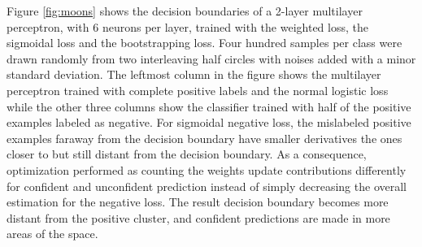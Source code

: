 Figure \ref{fig:moons} shows the decision boundaries of a 2-layer multilayer perceptron, with 6 neurons per layer, trained with the weighted loss, the sigmoidal loss and the bootstrapping loss.
Four hundred samples per class were drawn randomly from two interleaving half circles with noises added with a minor standard deviation.
The leftmost column in the figure shows the multilayer perceptron trained with complete positive labels and the normal logistic loss while the other three columns show the classifier trained with half of the positive examples labeled as negative.
For sigmoidal negative loss, the mislabeled positive examples faraway from the decision boundary have smaller derivatives the ones closer to but still distant from the decision boundary.
As a consequence, optimization performed as counting the weights update contributions differently for confident and unconfident prediction instead of simply decreasing the overall estimation for the negative loss.
The result decision boundary becomes more distant from the positive cluster, and confident predictions are made in more areas of the space.


